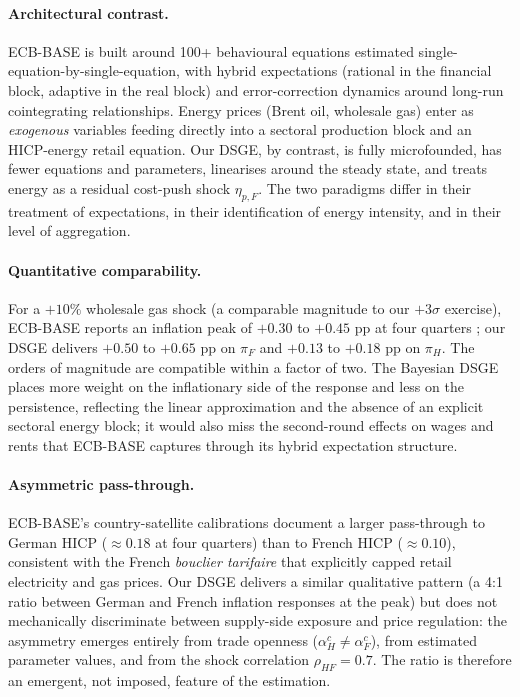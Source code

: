 \documentclass[11pt,a4paper]{article}
\begin{document}
\paragraph{Architectural contrast.}
ECB-BASE is built around 100+ behavioural equations estimated
single-equation-by-single-equation, with hybrid expectations
(rational in the financial block, adaptive in the real block) and
error-correction dynamics around long-run cointegrating
relationships. Energy prices (Brent oil, wholesale gas) enter as
\emph{exogenous} variables feeding directly into a sectoral
production block and an HICP-energy retail equation. Our DSGE, by
contrast, is fully microfounded, has fewer equations and parameters,
linearises around the steady state, and treats energy as a residual
cost-push shock $\eta_{p,F}$. The two paradigms differ in their
treatment of expectations, in their identification of energy
intensity, and in their level of aggregation.

\paragraph{Quantitative comparability.}
For a $+10\%$ wholesale gas shock (a comparable magnitude to our
$+3\sigma$ exercise), ECB-BASE reports an inflation peak of
$+0.30$ to $+0.45$ pp at four quarters \citep{ECBBASE2019}; our
DSGE delivers $+0.50$ to $+0.65$ pp on $\pi_F$ and $+0.13$ to
$+0.18$ pp on $\pi_H$. The orders of magnitude are compatible
within a factor of two. The Bayesian DSGE places more weight on the
inflationary side of the response and less on the persistence,
reflecting the linear approximation and the absence of an explicit
sectoral energy block; it would also miss the second-round effects
on wages and rents that ECB-BASE captures through its hybrid
expectation structure.

\paragraph{Asymmetric pass-through.}
ECB-BASE's country-satellite calibrations document a
larger pass-through to German HICP ($\approx 0.18$ at four quarters)
than to French HICP ($\approx 0.10$), consistent with the French
\emph{bouclier tarifaire} that explicitly capped retail electricity
and gas prices. Our DSGE delivers a similar qualitative pattern (a
4:1 ratio between German and French inflation responses at the
peak) but does not mechanically discriminate between supply-side
exposure and price regulation: the asymmetry emerges entirely from
trade openness ($\alpha^c_H \neq \alpha^c_F$), from estimated
parameter values, and from the shock correlation $\rho_{HF}=0.7$.
The ratio is therefore an emergent, not imposed, feature of the
estimation.
\end{document}
